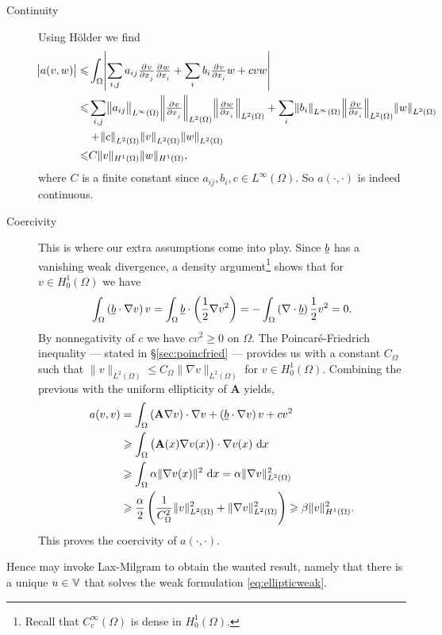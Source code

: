 \documentclass[thesis.tex]{subfiles}
\begin{document}
\begin{description}
  \item[Continuity]Using H\"older we find
    \begin{align*}
      \abs{a(v,w)} \leq &\int_\Omega \abs{\sum_{i,j} a_{ij} \pd{v}{x_j}\pd{w}{x_i}  + \sum_i b_i \pd{v}{x_i}w + cvw}\\
                   \leq &\sum_{i,j} \norm{ a_{ij}}_{L^\infty(\Omega)} \norm{ \pd{v}{x_j}}_{L^2(\Omega)} \norm{ \pd{w}{x_i}}_{L^2(\Omega)} + \sum_i \norm{b_i}_{L^\infty(\Omega)} \norm{\pd{v}{x_i}}_{L^2(\Omega)} \norm{w}_{L^2(\Omega)} \\
                   &+ \norm{c}_{L^2(\Omega)} \norm{v}_{L^2(\Omega)} \norm{w}_{L^2(\Omega)} \\
                   \leq &C \|v\|_{H^1(\Omega)} \|w\|_{H^1(\Omega)},
    \end{align*}
    where $C$ is a finite constant since $a_{ij}, b_i, c \in L^\infty(\Omega)$. So $a(\cdot,\cdot)$ is indeed continuous.
  \item[Coercivity] This is where our extra assumptions come into play. Since $\underline{b}$ has a vanishing weak divergence, a density argument\footnote{Recall that $C_c^\infty(\Omega)$ is dense in $H_0^1(\Omega)$.} shows that for $v \in H_0^1(\Omega)$ we have
    \[
      \int_\Omega \left(\underline{b} \cdot \nabla v\right)v  = \int_\Omega \underline{b} \cdot \left({1 \over 2} \nabla v^2\right) = - \int_\Omega \left(\nabla \cdot \underline{b} \right) {1 \over 2} v^2 = 0.
    \]
    By nonnegativity of $c$ we have $cv^2 \geq 0$ on $\Omega$. 
    The Poincar\'e-Friedrich  inequality --- stated in \S\ref{sec:poincfried} --- provides us with a constant $C_\Omega$ such that $\|v\|_{L^2(\Omega)} \leq C_\Omega \|\nabla v\|_{L^2(\Omega)}$ for $v \in H_0^1(\Omega)$. Combining the previous with the uniform ellipticity of $\mathbf{A}$ yields,
    \begin{align*}
      a(v,v) &= \int_\Omega \left(\mathbf{A} \nabla v\right) \cdot \nabla v + \left(\v{b} \cdot \nabla v\right)v + cv^2 \\
      &\geq  \int_\Omega \left(\mathbf{A}(x) \nabla v(x)\right) \cdot \nabla v(x)\, \dif x \\
             &\geq  \int_\Omega \alpha \|\nabla v(x)\|^2\, \dif x = \alpha \|\nabla v\|^2_{L^2(\Omega)}\\
             &\geq \frac{\alpha}{2} \left(\frac{1}{C^2_\Omega} \|v\|^2_{L^2(\Omega)} + \|\nabla v\|^2_{L^2(\Omega)}\right) \geq \beta \|v\|^2_{H^1(\Omega)}.
    \end{align*}
    This proves the coercivity of $a(\cdot, \cdot)$.
\end{description}
Hence may invoke Lax-Milgram to obtain the wanted result, namely that there is a unique $u \in \mathbb{V}$ that solves the weak formulation \eqref{eq:ellipticweak}.
\end{document}
